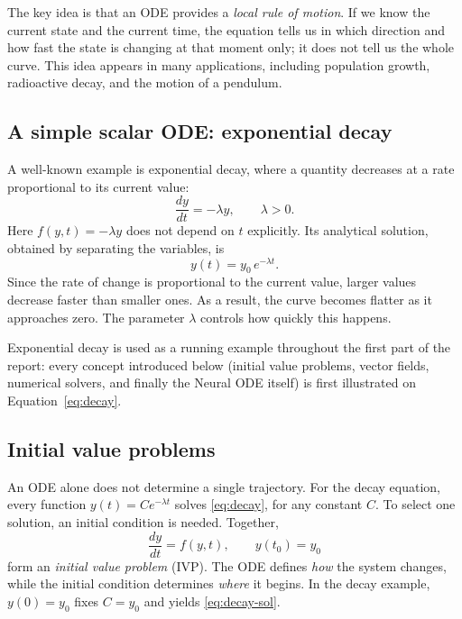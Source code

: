 \documentclass[11pt,a4paper]{article}
\begin{document}
The key idea is that an ODE provides a \emph{local rule of motion}. If we know
the current state and the current time, the equation tells us in which direction
and how fast the state is changing at that moment only; it does not tell us the whole
curve. This idea appears in many applications, including population growth,
radioactive decay, and the motion of a pendulum.

\subsection{A simple scalar ODE: exponential decay}

A well-known example is exponential decay, where a quantity decreases at a rate
proportional to its current value:
\begin{equation}
  \frac{dy}{dt} = -\lambda y, \qquad \lambda > 0 .
  \label{eq:decay}
\end{equation}
Here $f(y,t) = -\lambda y$ does not depend on $t$ explicitly. Its analytical
solution, obtained by separating the variables, is
\begin{equation}
  y(t) = y_0\, e^{-\lambda t}.
  \label{eq:decay-sol}
\end{equation}
Since the rate of change is proportional to the current value, larger values
decrease faster than smaller ones. As a result, the curve becomes flatter as it
approaches zero. The parameter $\lambda$ controls how quickly this happens.

Exponential decay is used as a running example throughout the first part of the
report: every concept introduced below (initial value problems, vector fields,
numerical solvers, and finally the Neural ODE itself) is first illustrated on
Equation~\eqref{eq:decay}.

\subsection{Initial value problems}

An ODE alone does not determine a single trajectory. For the decay equation, every
function $y(t) = C e^{-\lambda t}$ solves \eqref{eq:decay}, for any constant $C$.
To select one solution, an initial condition is needed. Together,
\begin{equation}
  \frac{dy}{dt} = f(y,t), \qquad y(t_0) = y_0
  \label{eq:ivp}
\end{equation}
form an \emph{initial value problem} (IVP). The ODE defines \emph{how} the system
changes, while the initial condition determines \emph{where} it begins. In the
decay example, $y(0) = y_0$ fixes $C = y_0$ and yields \eqref{eq:decay-sol}.
\end{document}
